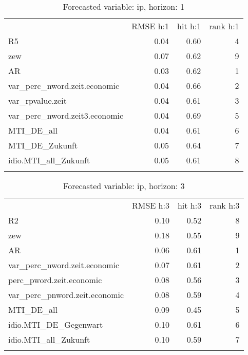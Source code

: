 \documentclass[]{article}
\title{}
\author{}
\date{}
\begin{document}
\maketitle


\begin{longtable}[c]{@{}lrrr@{}}
\toprule\addlinespace
& RMSE h:1 & hit h:1 & rank h:1
\\\addlinespace
\midrule\endhead
R5 & 0.04 & 0.60 & 4
\\\addlinespace
zew & 0.07 & 0.62 & 9
\\\addlinespace
AR & 0.03 & 0.62 & 1
\\\addlinespace
var\_perc\_nword.zeit.economic & 0.04 & 0.66 & 2
\\\addlinespace
var\_rpvalue.zeit & 0.04 & 0.61 & 3
\\\addlinespace
var\_perc\_nword.zeit3.economic & 0.04 & 0.69 & 5
\\\addlinespace
MTI\_DE\_all & 0.04 & 0.61 & 6
\\\addlinespace
MTI\_DE\_Zukunft & 0.05 & 0.64 & 7
\\\addlinespace
idio.MTI\_all\_Zukunft & 0.05 & 0.61 & 8
\\\addlinespace
\bottomrule
\addlinespace
\caption{Forecasted variable: ip, horizon: 1}
\end{longtable}

\begin{longtable}[c]{@{}lrrr@{}}
\toprule\addlinespace
& RMSE h:3 & hit h:3 & rank h:3
\\\addlinespace
\midrule\endhead
R2 & 0.10 & 0.52 & 8
\\\addlinespace
zew & 0.18 & 0.55 & 9
\\\addlinespace
AR & 0.06 & 0.61 & 1
\\\addlinespace
var\_perc\_nword.zeit.economic & 0.07 & 0.61 & 2
\\\addlinespace
perc\_pword.zeit.economic & 0.08 & 0.56 & 3
\\\addlinespace
var\_perc\_pnword.zeit.economic & 0.08 & 0.59 & 4
\\\addlinespace
MTI\_DE\_all & 0.09 & 0.45 & 5
\\\addlinespace
idio.MTI\_DE\_Gegenwart & 0.10 & 0.61 & 6
\\\addlinespace
idio.MTI\_all\_Zukunft & 0.10 & 0.59 & 7
\\\addlinespace
\bottomrule
\addlinespace
\caption{Forecasted variable: ip, horizon: 3}
\end{longtable}
\end{document}
